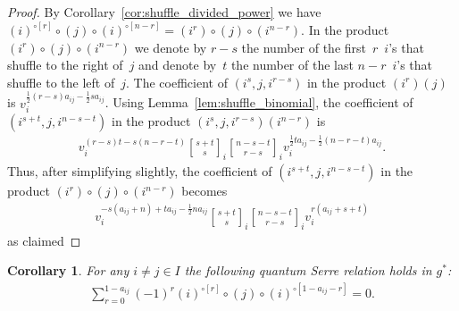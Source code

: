 \documentclass[pdftex]{sigma}
\numberwithin{equation}{section}
\newtheorem{Corollary}[Theorem]{Corollary}
\begin{document}
\begin{proof}
By Corollary~\ref{cor:shuffle_divided_power} we have
$(i)^{\circ[r]}\circ(j)\circ(i)^{\circ[n-r]}=(i^r)\circ(j)\circ(i^{n-r})$.
In the product $(i^r)\circ(j)\circ(i^{n-r})$ we denote by $r-s$ the number of the f\/irst~$r$~$i$'s that shuf\/f\/le to the
right of~$j$ and denote by~$t$ the number of the last $n-r$~$i$'s that shuf\/f\/le to the left of~$j$.
The coef\/f\/icient of $(i^s,j,i^{r-s})$ in the product $(i^r)(j)$ is $v_i^{\frac{1}{2}(r-s)a_{ij}-\frac{1}{2} sa_{ij}}$.
Using Lemma~\ref{lem:shuffle_binomial}, the coef\/f\/icient of $(i^{s+t},j,i^{n-s-t})$ in the product
$(i^s,j,i^{r-s})(i^{n-r})$ is
\begin{gather*}
v_i^{(r-s)t-s(n-r-t)} {s+t\brack s}_i {n-s-t\brack r-s}_i v_i^{\frac{1}{2} ta_{ij}-\frac{1}{2} (n-r-t)a_{ij}}.
\end{gather*}
Thus, after simplifying slightly, the coef\/f\/icient of $(i^{s+t},j,i^{n-s-t})$ in the product
$(i^r)\circ(j)\circ(i^{n-r})$ becomes
\begin{gather*}
v_i^{-s(a_{ij}+n)+ta_{ij}-\frac{1}{2} na_{ij}} {s+t\brack s}_i {n-s-t\brack r-s}_i v_i^{r(a_{ij}+s+t)}
\end{gather*}
as claimed
\end{proof}

\begin{Corollary}
\label{cor:shuffle Serre}
For any $i\ne j\in I$ the following quantum Serre relation holds in $g^*$:
\begin{gather}
\label{eq:shuffle_Serre}
\sum\limits_{r=0}^{1-a_{ij}} (-1)^r (i)^{\circ[r]}\circ(j)\circ(i)^{\circ[1-a_{ij}-r]}=0.
\end{gather}
\end{Corollary}
\end{document}

